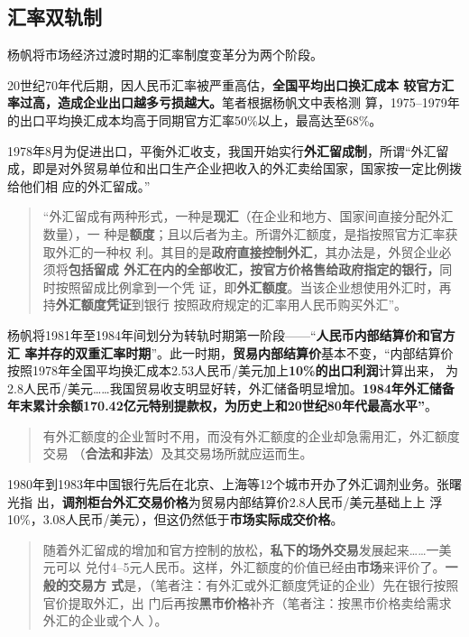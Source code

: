 \subsection{汇率双轨制}

杨帆将市场经济过渡时期的汇率制度变革分为两个阶段。\cite{huilvshi}

20世纪70年代后期，因人民币汇率被严重高估，\textbf{全国平均出口换汇成本
  较官方汇率过高，造成企业出口越多亏损越大。}笔者根据杨帆文中表格测
算，1975--1979年的出口平均换汇成本均高于同期官方汇率50\%以上，最高达至68\%。

1978年8月为促进出口，平衡外汇收支，我国开始实行\textbf{外汇留成制}，所谓“外汇留
成，即是对外贸易单位和出口生产企业把收入的外汇卖给国家，国家按一定比例拨给他们相
应的外汇留成。”

\begin{quotation}
  “外汇留成有两种形式，一种是\textbf{现汇}（在企业和地方、国家间直接分配外汇数量），一
  种是\textbf{额度}；且以后者为主。所谓外汇额度，是指按照官方汇率获取外汇的一种权
  利。其目的是\textbf{政府直接控制外汇}，其办法是，外贸企业必须将\textbf{包括留成
    外汇在内的全部收汇，按官方价格售给政府指定的银行，}同时按照留成比例拿到一个凭
  证，即\textbf{外汇额度}。当该企业想使用外汇时，再持\textbf{外汇额度凭证}到银行
  按照政府规定的汇率用人民币购买外汇”。\cite[769]{fengyunshi1b}
\end{quotation}


杨帆将1981年至1984年间划分为转轨时期第一阶段——“\textbf{人民币内部结算价和官方汇
  率并存的双重汇率时期}”。此一时期，\textbf{贸易内部结算价}基本不变，“内部结算价
按照1978年全国平均换汇成本2.53人民币/美元加上\textbf{10\%的出口利润}计算出来，
为2.8人民币/美元……我国贸易收支明显好转，外汇储备明显增加。\textbf{1984年外汇储备
  年末累计余额170.42亿元特别提款权，为历史上和20世纪80年代最高水平”}。

\begin{quotation}
  有外汇额度的企业暂时不用，而没有外汇额度的企业却急需用汇，外汇额度交易
  （\textbf{合法和非法}）及其交易场所就应运而生。\cite[769]{fengyunshi1b}
\end{quotation}

1980年到1983年中国银行先后在北京、上海等12个城市开办了外汇调剂业务。张曙光指
出，\textbf{调剂柜台外汇交易价格}为贸易内部结算价2.8人民币/美元基础上上
浮10\%，3.08人民币/美元），但这仍然低于\textbf{市场实际成交价格}。

\begin{quotation}
  随着外汇留成的增加和官方控制的放松，\textbf{私下的场外交易}发展起来……一美元可以
  兑付4--5元人民币。这样，外汇额度的价值已经由\textbf{市场}来评价了。\textbf{一般的交易方
    式}是，（笔者注：有外汇或外汇额度凭证的企业）先在银行按照官价提取外汇，出
  门后再按\textbf{黑市价格}补齐（笔者注：按黑市价格卖给需求外汇的企业或个人
  ）。\cite[769]{fengyunshi1b}
\end{quotation}

